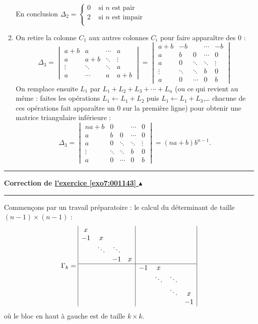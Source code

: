 \documentclass[11pt,a4paper]{article}
\newcounter{exo}
\newcommand{\correction}[1]{\hypertarget{cor7:#1}{}\label{cor7:#1}{\bf Correction de \hyperlink{exo7:#1}{l'exercice \ref{exo7:#1} $\blacktriangle$}}\vspace{1mm}\hrule\vspace{1mm}}
\newcommand{\fincorrection}{\vspace{1mm}\hrule\vspace*{7mm}}
\begin{document}
\begin{enumerate}
En conclusion $\Delta_2 = \begin{cases}
                           0 & \text{ si $n$ est pair} \\
                           2 & \text{ si $n$ est impair} \\                           
                          \end{cases}$

  \item
On retire la colonne $C_1$ aux autres colonnes $C_i$ pour faire apparaître des $0$ :
$$\Delta_3 = \begin{vmatrix}
    a+b  &    a   & \cdots &  a       \\
     a   &   a+b  & \ddots & \vdots   \\
  \vdots & \ddots & \ddots &  a       \\
     a   & \cdots &    a   & a+b 
\end{vmatrix}
= \begin{vmatrix}
    a+b  &    -b   & & \cdots &  -b       \\
     a   &   b     &   0 & \cdots        &  0   \\
     a   &   0 &  \ddots & \ddots & \vdots   \\
  \vdots & \ddots & \ddots &  b & 0       \\
     a   &  0 & \cdots &    0   & b 
\end{vmatrix}$$
On remplace ensuite $L_1$ par $L_1+L_2+L_3+\cdots +L_n$
(ou ce qui revient au même : faites les opérations 
$L_1 \leftarrow L_1+L_2$ puis $L_1 \leftarrow L_1+L_3$,\ldots
chacune de ces opérations fait apparaître un $0$ sur la première ligne)
pour obtenir une matrice triangulaire inférieure :
$$\Delta_3 = \begin{vmatrix}
   na+b  &    0   & & \cdots &  0       \\
     a   &   b     &   0 & \cdots        &  0   \\
     a   &   0 &  \ddots & \ddots & \vdots   \\
  \vdots & \ddots & \ddots &  b & 0       \\
     a   &  0 & \cdots &    0   & b 
\end{vmatrix}=(na+b)b^{n-1}.$$
\end{enumerate}
\fincorrection
\correction{001143}


Commençons par un travail préparatoire : le calcul du déterminant de taille $(n-1)\times (n-1)$ :
{\footnotesize$$\Gamma_k = 
\begin{array}{|cccc|cccc|} 
x  &        &        &   &&&&\\
-1 & x      &        &   &&&&\\
   & \ddots & \ddots &   &&&&\\
   &        & -1     & x &&&&\\ 
   \hline
&&&&  -1 & x      &       &   \\
&&&&     &\ddots & \ddots      &   \\
&&&&     & &\ddots & x  \\
&&&&     &       &     & -1 \\
\end{array}
$$}
où le bloc en haut à gauche est de taille $k\times k$.
\end{document}
